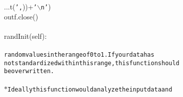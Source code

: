{{\begin{tabbing}
...{}t({\texttt{{'},\hspace{6pt}{'}}}))+{\texttt{{'}$\backslash$n{'}}})\\
\hspace{48pt}outf.close()\\
\\
\hspace{6pt}randInit(self):\\
\\
{\texttt{\hspace{72pt}random\hspace{6pt}values\hspace{6pt}in\hspace{6pt}the\hspace{6pt}range\hspace{6pt}of\hspace{6pt}0\hspace{6pt}to\hspace{6pt}1.\hspace{12pt}If\hspace{6pt}your\hspace{6pt}data\hspace{6pt}has}}\\
{\texttt{\hspace{72pt}not\hspace{6pt}standardized\hspace{6pt}within\hspace{6pt}this\hspace{6pt}range,\hspace{6pt}this\hspace{6pt}function\hspace{6pt}should}}\\
{\texttt{\hspace{72pt}be\hspace{6pt}overwritten.}}\\
{\texttt{\hspace{24pt}}}\\
{\texttt{\hspace{72pt}$\ast$\hspace{6pt}Ideally\hspace{6pt}this\hspace{6pt}function\hspace{6pt}would\hspace{6pt}analyze\hspace{6pt}the\hspace{6pt}input\hspace{6pt}data\hspace{6pt}and}}\\

\end{tabbing}}}
